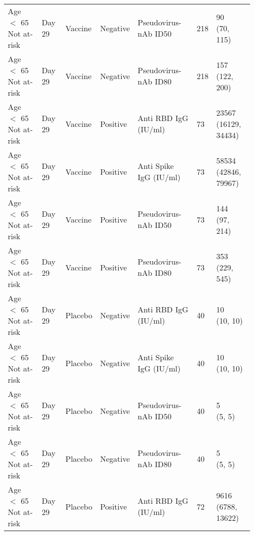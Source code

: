 \documentclass[]{book}
\theoremstyle{definition}
\theoremstyle{definition}
\theoremstyle{definition}
\newcommand{\1}{\mathbbm{1}}
\begin{document}
\begin{landscape}
\begin{ThreePartTable}
\begin{longtable}[t]{>{\raggedright\arraybackslash}p{7cm}llllll}
\hspace{1em}Age $<$ 65 Not at-risk & Day 29 & Vaccine & Negative & Pseudovirus-nAb ID50 & 218 & \makecell[l]{90\\(70, 115)}\\
\hspace{1em}Age $<$ 65 Not at-risk & Day 29 & Vaccine & Negative & Pseudovirus-nAb ID80 & 218 & \makecell[l]{157\\(122, 200)}\\
\hspace{1em}Age $<$ 65 Not at-risk & Day 29 & Vaccine & Positive & Anti RBD IgG (IU/ml) & 73 & \makecell[l]{23567\\(16129, 34434)}\\
\hspace{1em}Age $<$ 65 Not at-risk & Day 29 & Vaccine & Positive & Anti Spike IgG (IU/ml) & 73 & \makecell[l]{58534\\(42846, 79967)}\\
\hspace{1em}Age $<$ 65 Not at-risk & Day 29 & Vaccine & Positive & Pseudovirus-nAb ID50 & 73 & \makecell[l]{144\\(97, 214)}\\
\hspace{1em}Age $<$ 65 Not at-risk & Day 29 & Vaccine & Positive & Pseudovirus-nAb ID80 & 73 & \makecell[l]{353\\(229, 545)}\\
\hspace{1em}Age $<$ 65 Not at-risk & Day 29 & Placebo & Negative & Anti RBD IgG (IU/ml) & 40 & \makecell[l]{10\\(10, 10)}\\
\hspace{1em}Age $<$ 65 Not at-risk & Day 29 & Placebo & Negative & Anti Spike IgG (IU/ml) & 40 & \makecell[l]{10\\(10, 10)}\\
\hspace{1em}Age $<$ 65 Not at-risk & Day 29 & Placebo & Negative & Pseudovirus-nAb ID50 & 40 & \makecell[l]{5\\(5, 5)}\\
\hspace{1em}Age $<$ 65 Not at-risk & Day 29 & Placebo & Negative & Pseudovirus-nAb ID80 & 40 & \makecell[l]{5\\(5, 5)}\\
\hspace{1em}Age $<$ 65 Not at-risk & Day 29 & Placebo & Positive & Anti RBD IgG (IU/ml) & 72 & \makecell[l]{9616\\(6788, 13622)}\\

\end{longtable}
\end{ThreePartTable}
\end{landscape}
\end{document}
